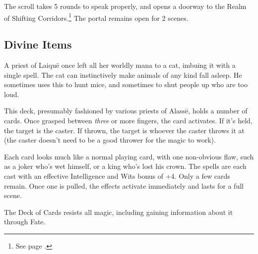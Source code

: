 \begin{multicols}{2}
The scroll takes 5 rounds to speak properly, and opens a doorway to the Realm of Shifting Corridors.\footnote{See page \pageref{shiftingcorridors}.}
The portal remains open for 2 scenes.

\subsection{Divine Items}


A priest of Laiqu\"{e} once left all her worldly mana to a cat, imbuing it with a single spell.
The cat can instinctively make animals of any kind fall asleep.
He sometimes uses this to hunt mice, and sometimes to shut people up who are too loud.

\label{deckofmanythings}

This deck, presumably fashioned by various priests of Alass\"{e}, holds a number of cards.
Once grasped between \emph{three} or more fingers, the card activates.
If it's held, the target is the caster.
If thrown, the target is whoever the caster throws it at (the caster doesn't need to be a good thrower for the magic to work).

Each card looks much like a normal playing card, with one non-obvious flaw, such as a joker who's wet himself, or a king who's lost his crown.  The spells are each cast with an effective Intelligence and Wits bonus of +4.  Only a few cards remain.  Once one is pulled, the effects activate immediately and lasts for a full scene.

The Deck of Cards resists all magic, including gaining information about it through Fate.


\end{multicols}
